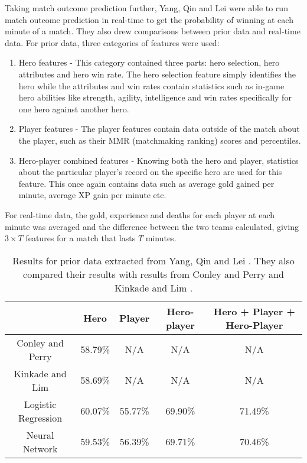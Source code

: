 \documentclass[Report.tex]{subfiles}
\begin{document}
Taking match outcome prediction further, Yang, Qin and Lei \cite{dota-yang} were able to run match outcome prediction in real-time to get the probability of winning at each minute of a match. They also drew comparisons between prior data and real-time data. For prior data, three categories of features were used:
\begin{enumerate}
\item Hero features - This category contained three parts: hero selection, hero attributes and hero win rate. The hero selection feature simply identifies the hero while the attributes and win rates contain statistics such as in-game hero abilities like strength, agility, intelligence and win rates specifically for one hero against another hero.
\item Player features - The player features contain data outside of the match about the player, such as their MMR (matchmaking ranking) scores and percentiles.
\item Hero-player combined features - Knowing both the hero and player, statistics about the particular player's record on the specific hero are used for this feature. This once again contains data such as average gold gained per minute, average XP gain per minute etc. 
\end{enumerate}
For real-time data, the gold, experience and deaths for each player at each minute was averaged and the difference between the two teams calculated, giving $3 \times T$ features for a match that lasts $T$ minutes. 
\begin{table}[H]
\centering
\begin{tabular}{| c | c | c | c | c |}
\hline
 & \textbf{Hero} & \textbf{Player} & \textbf{Hero-player} & \textbf{Hero + Player + Hero-Player} \\ \hline
 Conley and Perry \cite{dota-conley} & 58.79\% & N/A & N/A & N/A \\ \hline
 Kinkade and Lim \cite{dota-kinkade} & 58.69\% & N/A & N/A & N/A \\ \hline
 Logistic Regression & 60.07\% & 55.77\% & 69.90\% & 71.49\% \\ \hline
 Neural Network & 59.53\% & 56.39\% & 69.71\% & 70.46\% \\ \hline
\end{tabular}
\caption{Results for prior data extracted from Yang, Qin and Lei \cite{dota-yang}. They also compared their results with results from Conley and Perry \cite{dota-conley} and Kinkade and Lim \cite{dota-kinkade}.}
\end{table}
\end{document}
